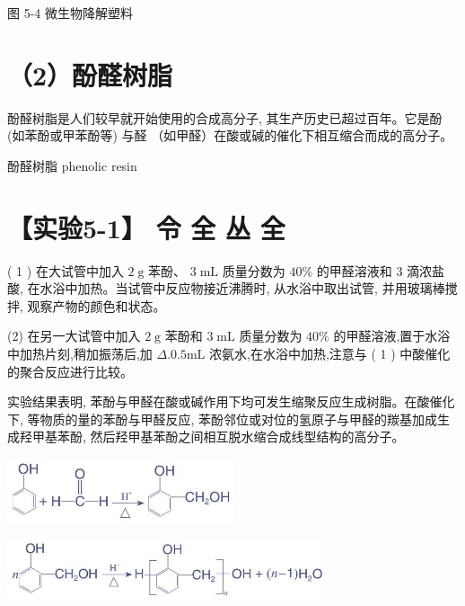 \documentclass[10pt]{article}
\begin{document}
图 5-4 微生物降解塑料

\section*{（2）酚醛树脂}

酚醛树脂是人们较早就开始使用的合成高分子, 其生产历史已超过百年。它是酚 (如苯酚或甲苯酚等) 与醛 （如甲醛）在酸或碱的催化下相互缩合而成的高分子。

\begin{mdframed}

酚醛树脂 phenolic resin

\end{mdframed}

\section*{【实验5-1】 令 全 丛 全}

( 1 ) 在大试管中加入 \(2\mathrm{\;g}\) 苯酚、 \(3\mathrm{\;{mL}}\) 质量分数为 \({40}\%\) 的甲醛溶液和 3 滴浓盐酸, 在水浴中加热。当试管中反应物接近沸腾时, 从水浴中取出试管, 并用玻璃棒搅拌, 观察产物的颜色和状态。

(2) 在另一大试管中加入 \(2\mathrm{\;g}\) 苯酚和 \(3\mathrm{\;{mL}}\) 质量分数为 \({40}\%\) 的甲醛溶液,置于水浴中加热片刻,稍加振荡后,加 \({\Delta .0.5}\mathrm{{mL}}\) 浓氨水,在水浴中加热,注意与 ( 1 ) 中酸催化的聚合反应进行比较。

实验结果表明, 苯酚与甲醛在酸或碱作用下均可发生缩聚反应生成树脂。在酸催化下, 等物质的量的苯酚与甲醛反应, 苯酚邻位或对位的氢原子与甲醛的羰基加成生成羟甲基苯酚, 然后羟甲基苯酚之间相互脱水缩合成线型结构的高分子。

\begin{center}
\includegraphics[max width=0.5\textwidth]{images/0190efc5-b58a-7c43-bfb0-e0a030df9cfd_145_346073.jpg}
\end{center}

\begin{center}
\includegraphics[max width=0.7\textwidth]{images/0190efc5-b58a-7c43-bfb0-e0a030df9cfd_146_677021.jpg}
\end{center}
\end{document}
